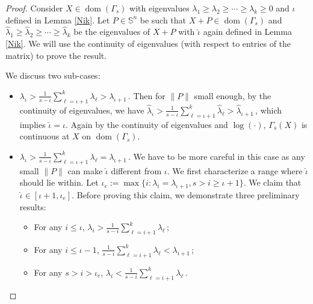 \documentclass[smallextended]{svjour3hack}       %
\DeclareMathOperator{\dom}{dom}
\begin{document}
\begin{proof}
Consider $X\in \dom\left(\Gamma_s\right)$ with eigenvalues $\lambda_1\ge\lambda_2\ge \cdots\ge \lambda_k\ge 0$ and $\iota$ defined in Lemma \ref{Nik}. Let $P\in \mathbb{S}^n$ be such that $X+P\in \dom\left(\Gamma_s\right)$ and $\hat \lambda_1\ge\hat \lambda_2\ge \cdots\ge \hat \lambda_k$ be the eigenvalues of $X+P$ with $\hat \iota$ again defined in Lemma \ref{Nik}. We will use the continuity of eigenvalues (with respect to entries of the matrix) to prove the result.

We discuss two sub-cases:
\begin{itemize}
    \item[1.] $\lambda_{\iota}>\frac{1}{s-\iota}\sum_{\ell=\iota+1}^k \lambda_{\ell}> \lambda_{\iota +1}$\,. Then for $\|P\|$ small enough, by the continuity of eigenvalues, we have $\hat \lambda_{\iota}>\frac{1}{s-\iota}\sum_{\ell=\iota+1}^k \hat\lambda_{\ell}> \hat\lambda_{\iota +1}$\,, which implies $\hat \iota=\iota$. Again by the continuity of eigenvalues and $\log(\cdot)$, $\Gamma_s(X)$ is continuous at $X$ on $\dom\left(\Gamma_s\right)$.
    \item[2.] $\lambda_{\iota}>\frac{1}{s-\iota}\sum_{\ell=\iota+1}^k \lambda_{\ell}= \lambda_{\iota +1}$\,. We have to be more careful in this case as any small $\|P\|$ can make $\hat{\iota}$ different from $\iota$. We first characterize a range where $\hat{\iota}$ should lie within. Let $\iota_e:=\max\{i: \lambda_i=\lambda_{\iota+1}, s> i\ge \iota+1\}$. We claim that $\hat \iota\in [\iota+1, \iota_e]$. Before proving this claim, we demonstrate three preliminary results:

    \begin{itemize}
        \item[(a)] For any $i\le \iota$, $\lambda_i > \frac{1}{s-i}\sum_{\ell=i+1}^k \lambda_{\ell}$\,;
        \item[(b)] For any $i\le \iota-1$, $\frac{1}{s-i}\sum_{\ell=i+1}^k \lambda_{\ell} < \lambda_{i+1}$\,;
        \item[(c)] For any $s> i> \iota_e$, $\lambda_i < \frac{1}{s-i}\sum_{\ell=i+1}^k \lambda_{\ell}$\,.
    \end{itemize}


\end{itemize}
\end{proof}
\end{document}
